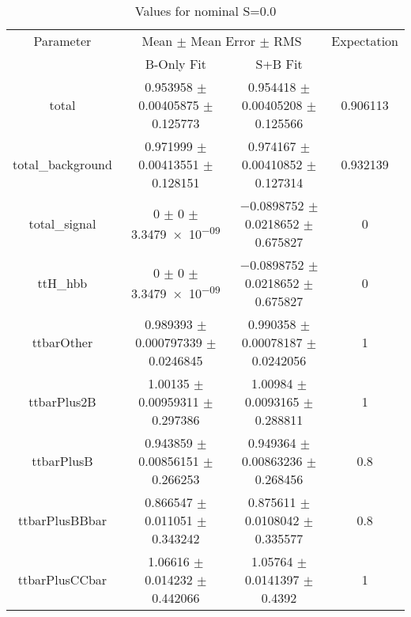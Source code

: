 \begin{table}
\centering
\caption{Values for nominal S=0.0}
\begin{tabular}{cccc}
\toprule
Parameter & \multicolumn{2}{c}{Mean $\pm$ Mean Error $\pm$ RMS} & Expectation\\
 & B-Only Fit & S+B Fit & \\
\midrule
total & \num{0.953958} $\pm$ \num{0.00405875} $\pm$ \num{0.125773} & \num{0.954418} $\pm$ \num{0.00405208} $\pm$ \num{0.125566} & \num{0.906113}\\
total\_background & \num{0.971999} $\pm$ \num{0.00413551} $\pm$ \num{0.128151} & \num{0.974167} $\pm$ \num{0.00410852} $\pm$ \num{0.127314} & \num{0.932139}\\
total\_signal & \num{0} $\pm$ \num{0} $\pm$ \num{3.3479e-09} & \num{-0.0898752} $\pm$ \num{0.0218652} $\pm$ \num{0.675827} & \num{0}\\
ttH\_hbb & \num{0} $\pm$ \num{0} $\pm$ \num{3.3479e-09} & \num{-0.0898752} $\pm$ \num{0.0218652} $\pm$ \num{0.675827} & \num{0}\\
ttbarOther & \num{0.989393} $\pm$ \num{0.000797339} $\pm$ \num{0.0246845} & \num{0.990358} $\pm$ \num{0.00078187} $\pm$ \num{0.0242056} & \num{1}\\
ttbarPlus2B & \num{1.00135} $\pm$ \num{0.00959311} $\pm$ \num{0.297386} & \num{1.00984} $\pm$ \num{0.0093165} $\pm$ \num{0.288811} & \num{1}\\
ttbarPlusB & \num{0.943859} $\pm$ \num{0.00856151} $\pm$ \num{0.266253} & \num{0.949364} $\pm$ \num{0.00863236} $\pm$ \num{0.268456} & \num{0.8}\\
ttbarPlusBBbar & \num{0.866547} $\pm$ \num{0.011051} $\pm$ \num{0.343242} & \num{0.875611} $\pm$ \num{0.0108042} $\pm$ \num{0.335577} & \num{0.8}\\
ttbarPlusCCbar & \num{1.06616} $\pm$ \num{0.014232} $\pm$ \num{0.442066} & \num{1.05764} $\pm$ \num{0.0141397} $\pm$ \num{0.4392} & \num{1}\\
\bottomrule
\end{tabular}
\end{table}